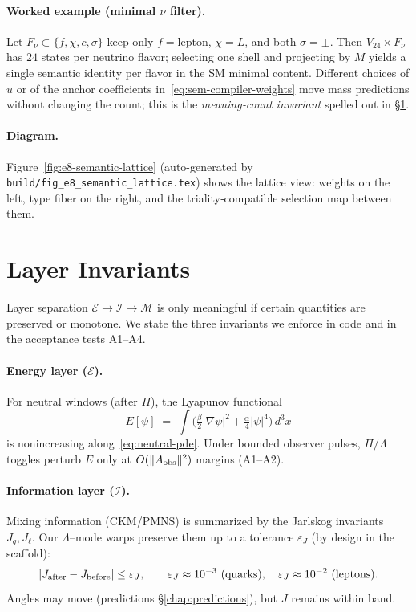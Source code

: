\paragraph{Worked example (minimal \(\nu\) filter).}
Let \(F_\nu\subset \{f,\chi,c,\sigma\}\) keep only \(f=\text{lepton}\), \(\chi=L\),
and both \(\sigma=\pm\). Then \(V_{24}\times F_\nu\) has \(24\) states per neutrino
flavor; selecting one shell and projecting by \(M\) yields a single semantic
identity per flavor in the SM minimal content. Different choices of \(u\) or
of the anchor coefficients in~\eqref{eq:sem-compiler-weights} move mass
predictions without changing the count; this is the \emph{meaning‐count invariant}
spelled out in §\ref{sec:layer-invariants}.

\paragraph{Diagram.}
Figure~\ref{fig:e8-semantic-lattice} (auto-generated by
\texttt{build/fig\_e8\_semantic\_lattice.tex}) shows the lattice view:
weights on the left, type fiber on the right, and the triality‐compatible
selection map between them.

\medskip





\section{Layer Invariants}
\label{sec:layer-invariants}

Layer separation \( \mathcal E \to \mathcal I \to \mathcal M \) is only meaningful if
certain quantities are preserved or monotone. We state the three invariants we
enforce in code and in the acceptance tests A1–A4.

\paragraph{Energy layer (\(\mathcal E\)).}
For neutral windows (after \(\Pi\)), the Lyapunov functional
\[
  E[\psi] \;=\; \int\!\Big(\tfrac{\beta}{2}|\nabla\psi|^2 + \tfrac{\alpha}{4}|\psi|^4\Big)\,d^3x
\]
is nonincreasing along~\eqref{eq:neutral-pde}. Under bounded observer pulses,
\(\Pi/\Lambda\) toggles perturb \(E\) only at \(O(\|A_{\rm obs}\|^2)\) margins (A1–A2).

\paragraph{Information layer (\(\mathcal I\)).}
Mixing information (CKM/PMNS) is summarized by the Jarlskog invariants
\(J_q,J_\ell\). Our \(\Lambda\)–mode warps preserve them up to a tolerance
\(\varepsilon_J\) (by design in the scaffold):
\[
  |J_{\rm after}-J_{\rm before}| \le \varepsilon_J ,
  \qquad
  \varepsilon_J \approx 10^{-3}\ \text{(quarks)},\quad
  \varepsilon_J \approx 10^{-2}\ \text{(leptons)}.
\]
Angles may move (predictions §\ref{chap:predictions}), but \(J\) remains within band.

